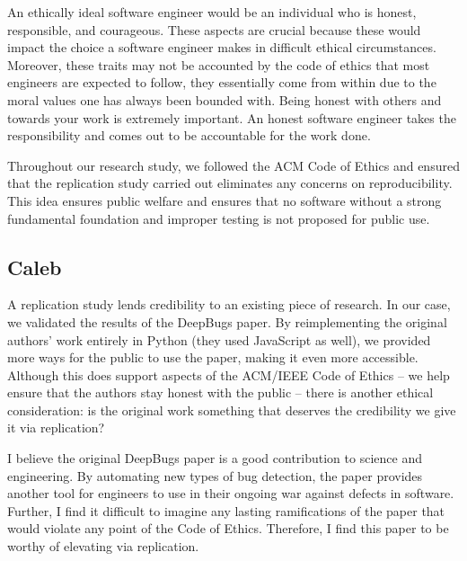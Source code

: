 An ethically ideal software engineer would be an individual who is honest, responsible, and courageous. These aspects are crucial because these would impact the choice a software engineer makes in difficult ethical circumstances. Moreover, these traits may not be accounted by the code of ethics that most engineers are expected to follow, they essentially come from within due to the moral values one has always been bounded with. Being honest with others and towards your work is extremely important. An honest software engineer takes the responsibility and comes out to be accountable for the work done. 

Throughout our research study, we followed the ACM Code of Ethics and ensured that the replication study carried out eliminates any concerns on reproducibility. This idea ensures public welfare and ensures that no software without a strong fundamental foundation and improper testing is not proposed for public use. 


\subsection{Caleb}
A replication study lends credibility to an existing piece of research. In our case, we validated the results of the DeepBugs paper. By reimplementing the original authors' work entirely in Python (they used JavaScript as well), we provided more ways for the public to use the paper, making it even more accessible. Although this does support aspects of the ACM/IEEE Code of Ethics -- we help ensure that the authors stay honest with the public -- there is another ethical consideration: is the original work something that deserves the credibility we give it via replication?

I believe the original DeepBugs paper is a good contribution to science and engineering. By automating new types of bug detection, the paper provides another tool for engineers to use in their ongoing war against defects in software. Further, I find it difficult to imagine any lasting ramifications of the paper that would violate any point of the Code of Ethics. Therefore, I find this paper to be worthy of elevating via replication.

